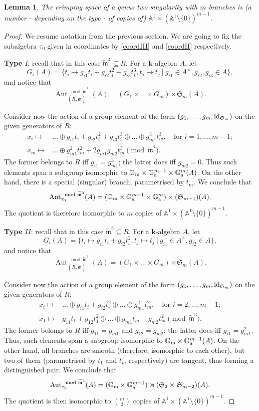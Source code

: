 \documentclass[11pt]{amsart}
\renewcommand{\k}{\mathbf k}
\newcommand{\tR}{\widetilde{R}}
\newcommand{\tm}{\widetilde{\mathfrak m}}
\newcommand{\Aaff}{\mathbb A}
\newcommand{\Gm}{\mathbb{G}_{\rm{m}}}
\newcommand{\Ga}{\mathbb{G}_{\rm{a}}}
\newcommand{\Aut}{\operatorname{Aut}}
\newcommand{\id}{{\rm id}}
\theoremstyle{plain}
\newtheorem{lem}[thm]{Lemma}
\theoremstyle{definition}
\begin{document}
\begin{lem}\label{lem:crimping}
 The crimping space of a genus two singularity with $m$ branches is (a number - depending on the type - of copies of) $\Aaff^1\times(\Aaff^1\setminus\{0\})^{m-1}$.
\end{lem}
\begin{proof}
We resume notation from the previous section. We are going to fix the subalgebra $\tau_0$ given in coordinates by \eqref{coordIII} and \eqref{coordII} respectively.

\textbf{Type $I$}: recall that in this case $\tm^4\subseteq R$. For a $\k$-algebra $A$, let
\[G_i(A)=\{t_i\mapsto g_{i1}t_i+g_{i2}t_i^2+g_{i3}t_i^3,t_j\mapsto t_j\ |\ g_{i1}\in A^\times,g_{i2},g_{i3}\in A\},\]
and notice that
\[\Aut_{(\tR,\tm)}^{\mod\tm^4}(A)=(G_1\times\ldots\times G_m)\rtimes \mathfrak{S}_m(A).\]

Consider now the action of a group element of the form $(g_1,\ldots,g_m;\id_{\mathfrak{S}_m})$ on the given generators of $R$:
\begin{align*}
 x_i\mapsto& \ldots\oplus g_{i1}t_i+g_{i2}t_i^2+g_{i3}t_i^3\oplus\ldots\oplus g_{m1}^3t_m^3,\quad\text{for } i=1,\ldots,m-1;\\
 x_m\mapsto& \ldots\oplus g_{m1}^2t_m^2+2g_{m1}g_{m2}t_m^3 \pmod{\tm^4}.
\end{align*}
The former belongs to $R$ iff $g_{i1}=g_{m1}^3$; the latter does iff $g_{m2}=0$. Thus such elements span a subgroup isomorphic to $\Gm\times\Ga^{m-1}\times\Ga^m(A)$. On the other hand, there is a special (singular) branch, parametrised by $t_m$. We conclude that
\[\Aut_{\tau_0}^{\mod\tm^3}(A)=(\Gm\times\Ga^{m-1}\times\Ga^m)\rtimes(\mathfrak{S}_{m-1})(A).\]
The quotient is therefore isomorphic to $m$ copies of $\Aaff^1\times(\Aaff^1\setminus\{0\})^{m-1}$. 

\textbf{Type $I\!I$}: recall that in this case $\tm^3\subseteq R$. For a $\k$-algebra $A$, let
\[G_i(A)=\{t_i\mapsto g_{i1}t_i+g_{i2}t_i^2,t_j\mapsto t_j\ |\ g_{i1}\in A^\times,g_{i2}\in A\},\]
and notice that
\[\Aut_{(\tR,\tm)}^{\mod\tm^3}(A)=(G_1\times\ldots\times G_m)\rtimes \mathfrak{S}_m(A).\]

Consider now the action of a group element of the form $(g_1,\ldots,g_m;\id_{\mathfrak{S}_m})$ on the given generators of $R$:
\begin{align*}
 x_i\mapsto& \ldots\oplus g_{i1}t_i+g_{i2}t_i^2\oplus\ldots\oplus g_{m1}^2t_m^2,\quad\text{for } i=2,\ldots,m-1;\\
 x_1\mapsto& g_{11}t_1+g_{12}t_1^2\oplus\ldots\oplus g_{m1}t_m+g_{m2}t_m^2 \pmod{\tm^3}.
\end{align*}
The former belongs to $R$ iff $g_{11}=g_{m1}$ and $g_{12}=g_{m2}$; the latter does iff $g_{i1}=g_{m1}^2$. Thus, such elements span a subgroup isomorphic to $\Gm\times\Ga^{m-1}(A)$. On the other hand, all branches are smooth (therefore, isomorphic to each other), but two of them (parametrised by $t_1$ and $t_m$ respectively) are tangent, thus forming a distinguished pair. We conclude that
\[\Aut_{\tau_0}^{\mod\tm^3}(A)=(\Gm\times\Ga^{m-1})\rtimes(\mathfrak{S}_2\times\mathfrak{S}_{m-2})(A).\]
The quotient is then isomorphic to $\binom{m}{2}$ copies of $\Aaff^1\times(\Aaff^1\setminus\{0\})^{m-1}$.
\end{proof}
\end{document}
